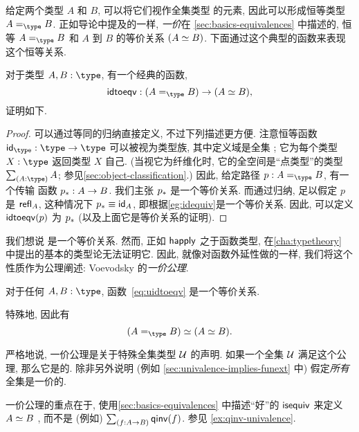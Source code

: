 %
%
给定两个类型 $A$ 和 $B$, 可以将它们视作全集类型 \type 的元素, 因此可以形成恒等类型 $\id[\type]AB$.
正如导论中提及的一样, \emph{一价}在 \cref{sec:basics-equivalences} 中描述的, 恒等 $\id[\type]AB$ 和 $A$ 到 $B$ 的等价关系 $(\eqv AB)$.
下面通过这个典型的函数来表现这个恒等关系.

\begin{lem}
    \label{thm:idtoeqv}
    对于类型 $A,B:\type$, 有一个经典的函数,
    \begin{equation}
        \label{eq:uidtoeqv}
        \idtoeqv : (\id[\type]AB) \to (\eqv A B),
    \end{equation}
    证明如下.
\end{lem}
\begin{proof}
    可以通过等同的归纳直接定义, 不过下列描述更方便.
    注意恒等函数 $\idfunc[\type]:\type\to\type$ 可以被视为类型族, 其中定义域是全集 \type;
    它为每个类型 $X:\type$ 返回类型 $X$ 自己.
    (当视它为纤维化时, 它的全空间是``点类型''的类型 $\sm{A:\type}A$; 参见\cref{sec:object-classification}.)
    因此, 给定路径 $p:A =_\type B$, 有一个传输 函数 $\transf{p}:A \to B$.
    我们主张 $\transf{p}$ 是一个等价关系.
    而通过归纳, 足以假定 $p$ 是 $\refl A$, 这种情况下 $\transf{p} \jdeq \idfunc[A]$, 即根据\cref{eg:idequiv}是一个等价关系.
    因此, 可以定义 $\idtoeqv(p)$ 为 $\transf{p}$ (以及上面它是等价关系的证明).
\end{proof}

我们想说 \idtoeqv 是一个等价关系.
然而, 正如 $\happly$ 之于函数类型, 在\cref{cha:typetheory} 中提出的基本的类型论无法证明它.
因此, 就像对函数外延性做的一样, 我们将这个性质作为公理阐述: Voevodsky 的\emph{一价公理}.

\begin{axiom}[Univalence]
    \label{axiom:univalence}
    对于任何 $A,B:\type$, 函数~\eqref{eq:uidtoeqv} 是一个等价关系.
\end{axiom}

特殊地, 因此有
\[
    \eqv{(\id[\type]{A}{B})}{(\eqv A B)}.
\]

严格地说, 一价公理是关于特殊全集类型 $\UU$ 的声明.
如果一个全集 $\UU$ 满足这个公理, 那么它是的.
%
%
除非另外说明 (例如 \cref{sec:univalence-implies-funext} 中) 假定\emph{所有}全集是一价的.

\begin{rmk}
    一价公理的重点在于, 使用\cref{sec:basics-equivalences} 中描述``好''的 $\isequiv$ 来定义 $\eqv AB$ , 而不是 (例如) $\sm{f:A\to B} \qinv(f)$.
    参见 \cref{ex:qinv-univalence}.
\end{rmk}

